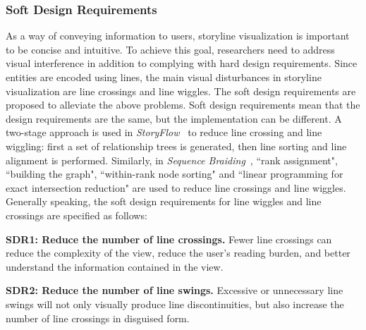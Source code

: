 \documentclass[review,journal]{vgtc}         %
\begin{document}
\subsubsection{Soft Design Requirements}
\noindent As a way of conveying information to users, storyline visualization is important to be concise and intuitive. To achieve this goal, researchers need to address visual interference in addition to complying with hard design requirements. Since entities are encoded using lines, the main visual disturbances in storyline visualization are line crossings and line wiggles. The soft design requirements are proposed to alleviate the above problems. Soft design requirements mean that the design requirements are the same, but the implementation can be different. A two-stage approach is used in \textit{StoryFlow}~\cite{liu_storyflow_2013} to reduce line crossing and line wiggling: first a set of relationship trees is generated, then line sorting and line alignment is performed. Similarly, in \textit{Sequence Braiding}~\cite{di_bartolomeo_s_2020}, ``rank assignment", ``building the graph", ``within-rank node sorting" and ``linear programming for exact intersection reduction" are used to reduce line crossings and line wiggles. Generally speaking, the soft design requirements for line wiggles and line crossings are specified as follows: 

  \textbf{SDR1: Reduce the number of line crossings.} Fewer line crossings can reduce the complexity of the view, reduce the user's reading burden, and better understand the information contained in the view.

  \textbf{SDR2: Reduce the number of line swings.} Excessive or unnecessary line swings will not only visually produce line discontinuities, but also increase the number of line crossings in disguised form.
\end{document}
